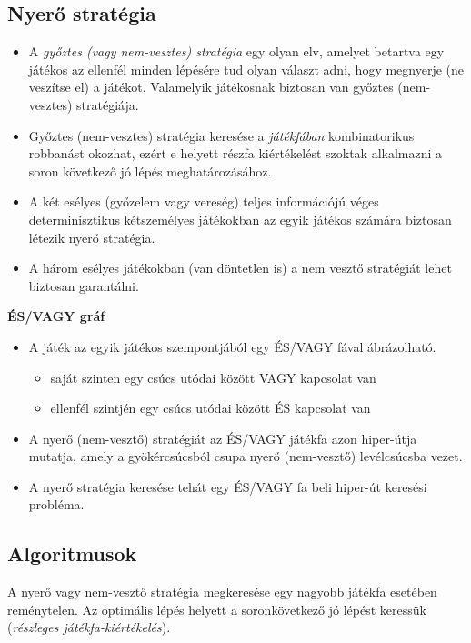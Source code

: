 \documentclass[12pt,margin=0px]{article}
\begin{document}
{    \subsection*{Nyerő stratégia}
    \begin{itemize}
    	\item A \textit{győztes (vagy nem-vesztes) stratégia} egy olyan elv, amelyet betartva egy játékos az ellenfél minden lépésére tud olyan választ adni, hogy megnyerje (ne veszítse el) a játékot. Valamelyik játékosnak biztosan van győztes (nem-vesztes) stratégiája.
        \item Győztes (nem-vesztes) stratégia keresése a \textit{játékfában} kombinatorikus robbanást okozhat, ezért e helyett részfa kiértékelést szoktak alkalmazni a soron következő jó lépés meghatározásához.
        \item A két esélyes (győzelem vagy vereség) teljes információjú véges determinisztikus kétszemélyes játékokban az egyik játékos számára biztosan létezik nyerő stratégia.
        \item A három esélyes játékokban (van döntetlen is) a nem vesztő stratégiát lehet biztosan garantálni.
    \end{itemize}

    \noindent \textbf{ÉS/VAGY gráf}
    \begin{itemize}
    \item A játék az egyik játékos szempontjából egy ÉS/VAGY fával ábrázolható.
    \begin{itemize}
        \item saját szinten egy csúcs utódai között VAGY kapcsolat van
        \item ellenfél szintjén egy csúcs utódai között ÉS kapcsolat van
    \end{itemize}
    \item A nyerő (nem-vesztő) stratégiát az ÉS/VAGY játékfa azon hiper-útja mutatja, amely a gyökércsúcsból csupa nyerő (nem-vesztő) levélcsúcsba vezet.
    \item A nyerő stratégia keresése tehát egy ÉS/VAGY fa beli hiper-út keresési probléma.
    \end{itemize}

    \subsection*{Algoritmusok}

    \noindent A nyerő vagy nem-vesztő stratégia megkeresése egy nagyobb játékfa esetében reménytelen. Az optimális lépés helyett a soronkövetkező jó lépést keressük (\emph{részleges játékfa-kiértékelés}). \\

}
\end{document}

